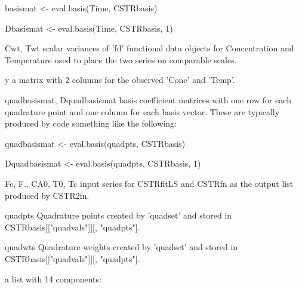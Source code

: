 \documentclass{article}
\begin{document}
\begin{Arguments}
\begin{ldescription}
{basismat <- eval.basis(Time, CSTRbasis)

Dbasismat <- eval.basis(Time, CSTRbasis, 1)
    
\item[Cwt, Twt] scalar variances of 'fd' functional data objects for
Concentration and Temperature used to place the two series on
comparable scales.   


\item[y] a matrix with 2 columns for the observed 'Conc' and 'Temp'.

\item[quadbasismat, Dquadbasismat] basis coefficient matrices with one row for each quadrature
point and one column for each basis vector.  These are typically
produced by code something like the following:  

quadbasismat <- eval.basis(quadpts, CSTRbasis) 

Dquadbasismat <- eval.basis(quadpts, CSTRbasis, 1)


\item[Fc, F., CA0, T0, Tc] input series for CSTRfitLS and CSTRfn as the output list
produced by CSTR2in.


\item[quadpts] Quadrature points created by 'quadset' and stored in
CSTRbasis[["quadvals"]][, "quadpts"].   

\item[quadwts] Quadrature weights created by 'quadset' and stored in
CSTRbasis[["quadvals"]][, "quadpts"].  

}

\item[\code{fitstruct}] a list with 14 components:  

\end{ldescription}
\end{Arguments}
\end{document}
